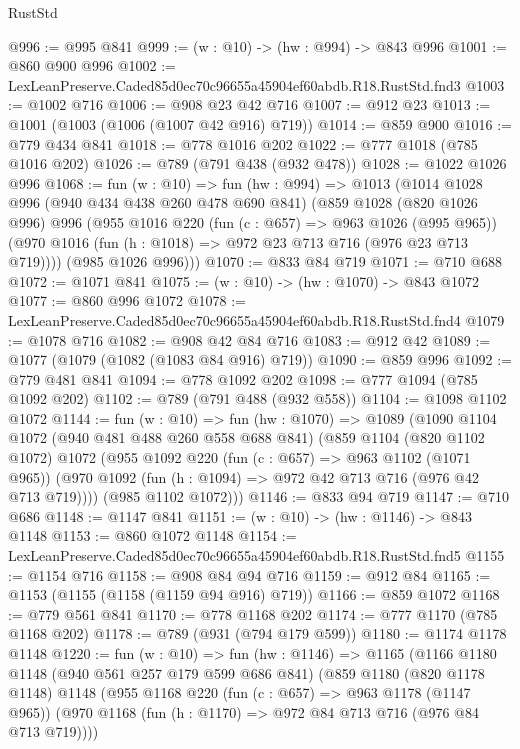 \begin{lexlean}{RustStd}
\begin{coremodule}
@996 := @995 @841
@999 := (w : @10) -> (hw : @994) -> @843 @996
@1001 := @860 @900 @996
@1002 := LexLeanPreserve.Caded85d0ec70c96655a45904ef60abdb.R18.RustStd.fnd3
@1003 := @1002 @716
@1006 := @908 @23 @42 @716
@1007 := @912 @23
@1013 := @1001 (@1003 (@1006 (@1007 @42 @916) @719))
@1014 := @859 @900
@1016 := @779 @434 @841
@1018 := @778 @1016 @202
@1022 := @777 @1018 (@785 @1016 @202)
@1026 := @789 (@791 @438 (@932 @478))
@1028 := @1022 @1026 @996
@1068 := fun (w : @10) =>
  fun (hw : @994) =>
  @1013
    (@1014
      @1028
      @996
      (@940 @434 @438 @260 @478 @690 @841)
      (@859
        @1028
        (@820 @1026 @996)
        @996
        (@955
          @1016
          @220
          (fun (c : @657) => @963 @1026 (@995 @965))
          (@970 @1016 (fun (h : @1018) => @972 @23 @713 @716 (@976 @23 @713 @719))))
        (@985 @1026 @996)))
@1070 := @833 @84 @719
@1071 := @710 @688
@1072 := @1071 @841
@1075 := (w : @10) -> (hw : @1070) -> @843 @1072
@1077 := @860 @996 @1072
@1078 := LexLeanPreserve.Caded85d0ec70c96655a45904ef60abdb.R18.RustStd.fnd4
@1079 := @1078 @716
@1082 := @908 @42 @84 @716
@1083 := @912 @42
@1089 := @1077 (@1079 (@1082 (@1083 @84 @916) @719))
@1090 := @859 @996
@1092 := @779 @481 @841
@1094 := @778 @1092 @202
@1098 := @777 @1094 (@785 @1092 @202)
@1102 := @789 (@791 @488 (@932 @558))
@1104 := @1098 @1102 @1072
@1144 := fun (w : @10) =>
  fun (hw : @1070) =>
  @1089
    (@1090
      @1104
      @1072
      (@940 @481 @488 @260 @558 @688 @841)
      (@859
        @1104
        (@820 @1102 @1072)
        @1072
        (@955
          @1092
          @220
          (fun (c : @657) => @963 @1102 (@1071 @965))
          (@970 @1092 (fun (h : @1094) => @972 @42 @713 @716 (@976 @42 @713 @719))))
        (@985 @1102 @1072)))
@1146 := @833 @94 @719
@1147 := @710 @686
@1148 := @1147 @841
@1151 := (w : @10) -> (hw : @1146) -> @843 @1148
@1153 := @860 @1072 @1148
@1154 := LexLeanPreserve.Caded85d0ec70c96655a45904ef60abdb.R18.RustStd.fnd5
@1155 := @1154 @716
@1158 := @908 @84 @94 @716
@1159 := @912 @84
@1165 := @1153 (@1155 (@1158 (@1159 @94 @916) @719))
@1166 := @859 @1072
@1168 := @779 @561 @841
@1170 := @778 @1168 @202
@1174 := @777 @1170 (@785 @1168 @202)
@1178 := @789 (@931 (@794 @179 @599))
@1180 := @1174 @1178 @1148
@1220 := fun (w : @10) =>
  fun (hw : @1146) =>
  @1165
    (@1166
      @1180
      @1148
      (@940 @561 @257 @179 @599 @686 @841)
      (@859
        @1180
        (@820 @1178 @1148)
        @1148
        (@955
          @1168
          @220
          (fun (c : @657) => @963 @1178 (@1147 @965))
          (@970 @1168 (fun (h : @1170) => @972 @84 @713 @716 (@976 @84 @713 @719))))

\end{coremodule}
\end{lexlean}

